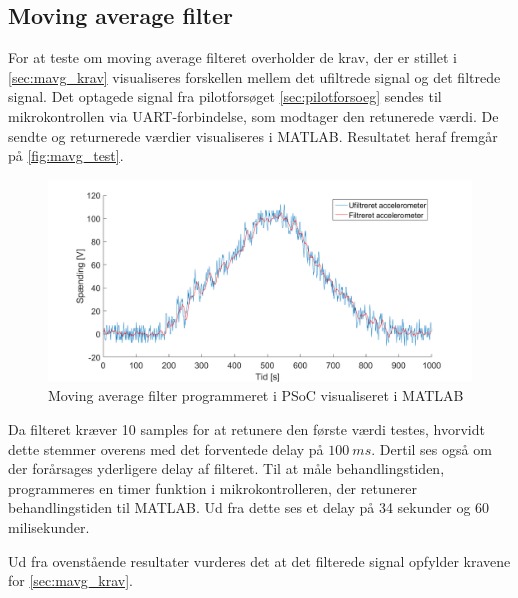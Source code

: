 \subsection{Moving average filter}
For at teste om moving average filteret overholder de krav, der er stillet i \autoref{sec:mavg_krav} visualiseres forskellen mellem det ufiltrede signal og det filtrede signal. Det optagede signal fra pilotforsøget \autoref{sec:pilotforsoeg} sendes til mikrokontrollen via UART-forbindelse, som modtager den retunerede værdi. De sendte og returnerede værdier visualiseres i MATLAB. Resultatet heraf fremgår på \autoref{fig:mavg_test}. 

\begin{figure}[H]
	\centering
	\includegraphics[width=1\textwidth]{figures/accelerometer_filter}
	\caption{Moving average filter programmeret i PSoC visualiseret i MATLAB}
	\label{fig:mavg_test}
\end{figure}


Da filteret kræver 10 samples for at retunere den første værdi testes, hvorvidt dette stemmer overens med det forventede delay på $100~ms$. Dertil ses også om der forårsages yderligere delay af filteret. Til at måle behandlingstiden, programmeres en timer funktion i mikrokontrolleren, der retunerer behandlingstiden til MATLAB. Ud fra dette ses et delay på 34 sekunder og 60 milisekunder.

Ud fra ovenstående resultater vurderes det at det filterede signal opfylder kravene for \autoref{sec:mavg_krav}. 